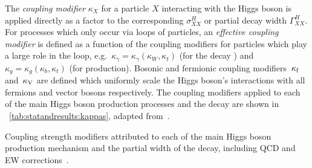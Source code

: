 The \emph{coupling modifier} $\kappa_{X}$ for a particle $X$ interacting with the Higgs boson is applied directly as a factor to the corresponding \crosssection $\sigma_{XX}^{H}$ or partial decay width $\Gamma^{H}_{XX}$. For processes which only occur via loops of particles, an \emph{effective coupling modifier} is defined as a function of the coupling modifiers for particles which play a large role in the loop, e.g.~$\kappa_{\gamma} = \kappa_{\gamma}(\kappa_W, \kappa_t) $ (for the decay \Hgg) and $\kappa_{g} = \kappa_{g}(\kappa_b, \kappa_t) $ (for \ggH production).
Bosonic and fermionic coupling modifiers $\,\kappa_\text{f}$ and $\,\kappa_\text{V}$ are defined which uniformly scale the Higgs boson's interactions with all fermions and vector bosons respectively. The coupling modifiers applied to each of the main Higgs boson production processes and the \Hgg decay are shown in \Table~\ref{tab:statandresults:kappas}, adapted from~\cite{Khachatryan:2016vau}.

 \begin{table}[h]
 \resizebox{\textwidth}{!}{

}
 \caption[Coupling strength modifiers attributed to each of the main Higgs boson production mechanism \crosssection\s and the partial width of the \Hgg decay, including QCD and EW corrections\quad\cite{Khachatryan:2016vau}.]{Coupling strength modifiers attributed to each of the main Higgs boson production mechanism \crosssection\s and the partial width of the \Hgg decay, including QCD and EW corrections~\cite{Khachatryan:2016vau}.}
 \label{tab:statandresults:kappas}
\end{table}

